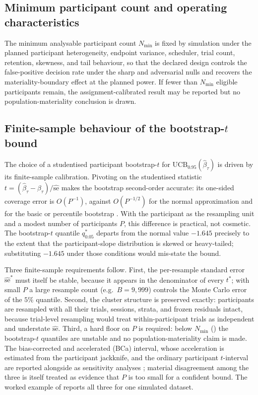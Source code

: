 \documentclass[11pt,a4paper]{article}
\theoremstyle{definition}
\newcommand{\UCB}{\mathrm{UCB}_{0.95}}
\begin{document}
\subsection{Minimum participant count and operating characteristics}
\label{sec:si-nmin}

The minimum analysable participant count \(N_{\min}\) is fixed by simulation under
the planned participant heterogeneity, endpoint variance, scheduler, trial count,
retention, skewness, and tail behaviour, so that the declared design controls the
false-positive decision rate under the sharp and adversarial nulls and recovers
the materiality-boundary effect at the planned power. If fewer than \(N_{\min}\)
eligible participants remain, the assignment-calibrated result may be reported but
no population-materiality conclusion is drawn.

\subsection{Finite-sample behaviour of the bootstrap-\texorpdfstring{$t$}{t} bound}
\label{sec:si-bootstrap-finite}

The choice of a studentised participant bootstrap-\(t\) for
\(\UCB(\widehat{\beta}_\tau)\) is driven by its finite-sample calibration.
Pivoting on the studentised statistic
\(t=(\widehat{\beta}_\tau-\beta_\tau)/\widehat{\mathrm{se}}\) makes the bootstrap
second-order accurate: its one-sided coverage error is \(O(P^{-1})\), against
\(O(P^{-1/2})\) for the normal approximation and for the basic or percentile
bootstrap \citep{Hall1992,DiCiccioEfron1996}. With the participant as the
resampling unit and a modest number of participants \(P\), this difference is
practical, not cosmetic. The bootstrap-\(t\) quantile \(q^{*}_{0.05}\) departs
from the normal value \(-1.645\) precisely to the extent that the
participant-slope distribution is skewed or heavy-tailed; substituting
\(-1.645\) under those conditions would mis-state the bound.

Three finite-sample requirements follow. First, the per-resample standard error
\(\widehat{\mathrm{se}}^{*}\) must itself be stable, because it appears in the
denominator of every \(t^{*}\); with small \(P\) a large resample count (e.g.\
\(B=9{,}999\)) controls the Monte Carlo error of the \(5\%\) quantile. Second,
the cluster structure is preserved exactly: participants are resampled with all
their trials, sessions, strata, and frozen residuals intact, because trial-level
resampling would treat within-participant trials as independent and understate
\(\widehat{\mathrm{se}}\). Third, a hard floor on \(P\) is required: below
\(N_{\min}\) (\Cref{sec:si-nmin}) the bootstrap-\(t\) quantiles are unstable and
no population-materiality claim is made. The bias-corrected and accelerated
(BCa) interval, whose acceleration is estimated from the participant jackknife,
and the ordinary participant \(t\)-interval are reported alongside as sensitivity
analyses \citep{EfronTibshirani1993}; material disagreement among the three is
itself treated as evidence that \(P\) is too small for a confident bound. The
worked example of \Cref{sec:si-worked-example} reports all three for one
simulated dataset.
\end{document}

